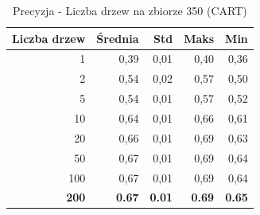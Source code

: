 \begin{table}[htbp]
\centering
\small
\setlength{\tabcolsep}{6pt}
\renewcommand{\arraystretch}{1.2}
\caption{Precyzja - Liczba drzew na zbiorze 350 (CART)}
\label{tab:CART_tree_count_350_precision}
\begin{tabular}{r|r|r|r|r}
\toprule
Liczba drzew & Średnia & Std & Maks & Min \\
\hline
1 & 0,39 & 0,01 & 0,40 & 0,36 \\
2 & 0,54 & 0,02 & 0,57 & 0,50 \\
5 & 0,54 & 0,01 & 0,57 & 0,52 \\
10 & 0,64 & 0,01 & 0,66 & 0,61 \\
20 & 0,66 & 0,01 & 0,69 & 0,63 \\
50 & 0,67 & 0,01 & 0,69 & 0,64 \\
100 & 0,67 & 0,01 & 0,69 & 0,64 \\
\textbf{200} & \textbf{0.67} & \textbf{0.01} & \textbf{0.69} & \textbf{0.65} \\
\bottomrule
\end{tabular}
\end{table}
